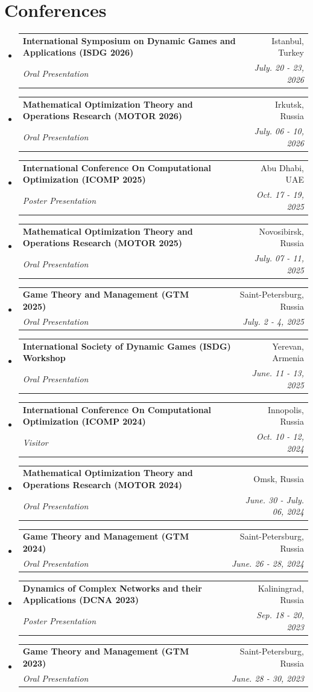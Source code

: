 \documentclass[letterpaper,10pt]{article}
\makeatletter
\newcommand{\resumeSubheading}[4]{
  \vspace{-2pt}\item
  \begin{tabular*}{0.97\textwidth}[t]{l@{\extracolsep{\fill}}r}
    \textbf{#1} & #2 \\
    \textit{\small#3} & \textit{\small #4} \\
  \end{tabular*}\vspace{-7pt}
}
\newenvironment{resumeSubHeadingList}{\begin{itemize}[leftmargin=0.15in, label={}]}{\end{itemize}}
\makeatother
\begin{document}
\section{Conferences}
\begin{resumeSubHeadingList}
  \resumeSubheading{\nth{21} International Symposium on Dynamic Games and Applications (ISDG 2026)}{Istanbul, Turkey}{Oral Presentation}{July. 20 - 23, 2026}
  \resumeSubheading{Mathematical Optimization Theory and Operations Research
                    (MOTOR 2026)}{Irkutsk, Russia}{Oral Presentation}{July. 06
                    - 10, 2026}
  \resumeSubheading{International Conference On Computational Optimization
                    (ICOMP 2025)}{Abu Dhabi, UAE}{Poster Presentation}{Oct. 17
                    - 19, 2025}
  \resumeSubheading{Mathematical Optimization Theory and Operations Research
                    (MOTOR 2025)}{Novosibirsk, Russia}{Oral Presentation}{July.
                    07 - 11, 2025}
  \resumeSubheading{Game Theory and Management (GTM 2025)}{Saint-Petersburg,
                    Russia}{Oral Presentation}{July. 2 - 4, 2025}
  \resumeSubheading{\nth{14} International Society of Dynamic Games (ISDG) Workshop}{Yerevan, Armenia}{Oral Presentation}{June. 11 - 13, 2025}
  \resumeSubheading{International Conference On Computational Optimization
                    (ICOMP 2024)}{Innopolis, Russia}{Visitor}{Oct. 10 - 12,
                    2024}
  \resumeSubheading{Mathematical Optimization Theory and Operations Research
                    (MOTOR 2024)}{Omsk, Russia}{Oral Presentation}{June. 30 -
                    July. 06, 2024}
  \resumeSubheading{Game Theory and Management (GTM 2024)}{Saint-Petersburg,
                    Russia}{Oral Presentation}{June. 26 - 28, 2024}
  \resumeSubheading{Dynamics of Complex Networks and their Applications (DCNA
                    2023)}{Kaliningrad, Russia}{Poster Presentation}{Sep. 18 -
                    20, 2023}
  \resumeSubheading{Game Theory and Management (GTM 2023)}{Saint-Petersburg,
                    Russia}{Oral Presentation}{June. 28 - 30, 2023}
\end{resumeSubHeadingList}
\end{document}
